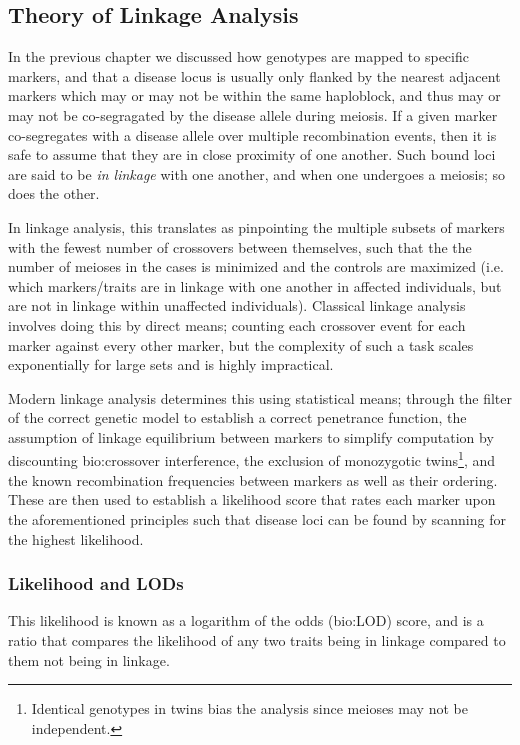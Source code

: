 \subsection{Theory of Linkage Analysis}

In the previous chapter we discussed how genotypes are mapped to specific markers, and that a disease locus is usually only flanked by the nearest adjacent markers which may or may not be within the same haploblock, and thus may or may not be co-segragated by the disease allele during meiosis.
If a given marker co-segregates with a disease allele over multiple recombination events, then it is safe to assume that they are in close proximity of one another. Such bound loci are said to be \textit{in linkage} with one another, and when one undergoes a meiosis; so does the other.

In linkage analysis, this translates as pinpointing the multiple subsets of markers with the fewest number of crossovers between themselves, such that the the number of meioses in the cases is minimized and the controls are maximized (i.e. which markers/traits are in linkage with one another in affected individuals, but are not in linkage within unaffected individuals).
Classical linkage analysis involves doing this by direct means; counting each crossover event for each marker against every other marker, but the complexity of such a task scales exponentially for large sets and is highly impractical.

Modern linkage analysis determines this using statistical means; through the filter of the correct genetic model to establish a correct penetrance function,  the assumption of linkage equilibrium between markers to simplify computation by discounting \gls{bio:crossover interference}, the exclusion of monozygotic twins\footnote{Identical genotypes in twins bias the analysis since meioses may not be independent.}, and the known recombination frequencies between markers as well as their ordering. These are then used to establish a likelihood score that rates each marker upon the aforementioned principles such that disease loci can be found by scanning for the highest likelihood.

\subsubsection{Likelihood and LODs}

This likelihood is known as a logarithm of the odds (\gls{bio:LOD}) score, and is a ratio  that compares the likelihood of any two traits being in linkage compared to them not being in linkage. 

